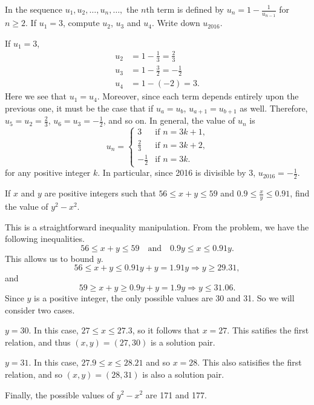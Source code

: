 \begin{question}
    In the sequence $u_{1}, u_{2}, \ldots, u_{n}, \ldots, $ the $n$th
    term is defined by $u_{n} = 1 - \frac{1}{u_{n - 1}}$ for $n \geq 2$. If
    $u_{1} = 3$, compute $u_{2}$, $u_{3}$ and $u_{4}$. Write down $u_{2016}$.
\end{question}
\begin{solution} 
    If $u_1 = 3$,
    \begin{align*}
        u_2 &= 1 - \frac{1}{3} = \frac{2}{3}\\
        u_3 &= 1 - \frac{3}{2} = -\frac{1}{2}\\
        u_4 &= 1 - (-2) = 3.
    \end{align*}
    Here we see that $u_1 = u_4$. Moreover, since each term depends entirely
    upon the previous one, it must be the case that if $u_a = u_b$, $u_{a + 1}
    = u_{b + 1}$ as well. Therefore, $u_5 = u_2 = \frac{2}{3}$, $u_6 = u_3 =
    -\frac{1}{2}$, and so on. In general, the value of $u_n$ is 
    \[ u_n =
    \begin{cases}
        3 & \text{if $n = 3k + 1$,}\\
        \frac{2}{3} & \text{if $n = 3k + 2$,}\\
        -\frac{1}{2} & \text{if $n = 3k$.}
    \end{cases}
    \]
    for any positive integer $k$. In particular, since 2016 is divisible by 3,
    $u_{2016} = -\frac{1}{2}$.
\end{solution}

\begin{question}
    If $x$ and $y$ are positive integers such that $56 \leq x + y \leq 59$ and
    $0.9 \leq \frac{x}{y} \leq 0.91$, find the value of $y^2 - x^2$.
\end{question}
\begin{solution}
    This is a straightforward inequality manipulation. From the problem,
    we have the following inequalities.
    \[ 56 \leq x + y \leq 59 \quad \text{and} \quad 0.9y \leq x \leq 0.91y. \]
    This allows us to bound $y$.
    \[ 56 \leq x + y \leq 0.91y + y = 1.91y \Longrightarrow y \geq 29.31, \]
    and 
    \[ 59 \geq x + y \geq 0.9y + y = 1.9y \Longrightarrow y \leq 31.06. \]
    Since $y$ is a positive integer, the only possible values are 30 and 31. So
    we will consider two cases.

    \begin{case}{$y = 30$.}
        In this case, $27 \leq x \leq 27.3$, so it follows that $x = 27$. This
        satifies the first relation, and thus $(x, y) = (27, 30)$ is a solution
        pair.
    \end{case}
    \begin{case}{$y = 31$.}
        In this case, $27.9 \leq x \leq 28.21$ and so $x = 28$. This also
        satisifies the first relation, and so $(x, y) = (28, 31)$ is also a
        solution pair.
    \end{case}

    Finally, the possible values of $y^2 - x^2$ are 171 and 177.
\end{solution}

